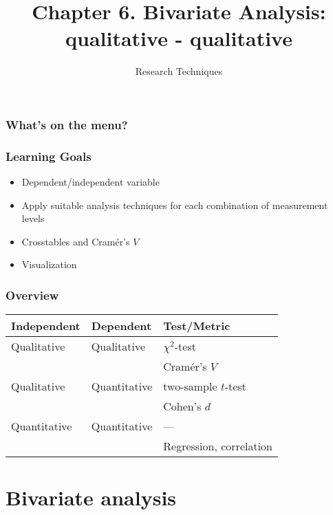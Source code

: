 \documentclass[aspectratio=169]{beamer}
\title{Chapter 6. Bivariate Analysis: qualitative - qualitative}
\subtitle{Research Techniques}
\begin{document}
\begin{frame}
  \maketitle
\end{frame}

\begin{frame}
  \frametitle{What's on the menu?}
  
  \tableofcontents
\end{frame}

\begin{frame}
  \frametitle{Learning Goals}
  
  \begin{itemize}
    \item Dependent/independent variable
    \item Apply suitable analysis techniques for each combination of measurement levels
    \item Crosstables and Cramér's $V$
    \item Visualization
  \end{itemize}
\end{frame}

\begin{frame}
  \frametitle{Overview}
    \centering
    \begin{tabular}{lll}
      \toprule
      \textbf{Independent}    & \textbf{Dependent}    & \textbf{Test/Metric}          \\
      \midrule
      Qualitative             & Qualitative           & $\chi^2$-test                 \\
                              &                       & Cramér's $V$                  \\
      Qualitative             & Quantitative          & two-sample $t$-test           \\
    	                        &                       & Cohen's $d$                   \\
      Quantitative            & Quantitative          & ---                           \\
    	                        &                       & Regression, correlation       \\
    	\bottomrule
    \end{tabular}
\end{frame}

\section{Bivariate analysis}
\end{document}
